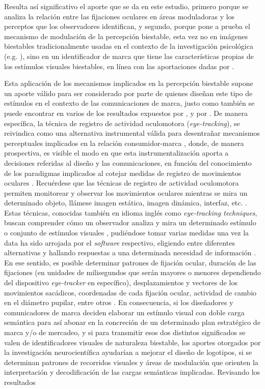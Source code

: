 \documentclass[spanish]{textolivre}
\begin{document}
Resulta así significativo el aporte que se da en este estudio, primero porque se analiza la relación entre las fijaciones oculares en áreas moduladoras y los perceptos que los observadores identifican, y segundo, porque pone a prueba el mecanismo de modulación de la percepción biestable, esta vez no en imágenes biestables tradicionalmente usadas en el contexto de la investigación psicológica (e.g. \textcite{rock_why_1994,kornmeier_ambiguous_2012,hsiao_assessing_2012}), sino en un identificador de marca que tiene las características propias de los estímulos visuales biestables, en línea con las aportaciones dadas por \textcite{rodriguez-martinez_can_2024}. 

Esta aplicación de los mecanismos implicados en la percepción biestable supone un aporte válido para ser considerado por parte de quienes diseñan este tipo de estímulos en el contexto de las comunicaciones de marca, justo como también se puede encontrar en varios de los resultados expuestos por \textcite{azmy_eye_2023}, y por \textcite{rodriguez-martinez_can_2024}. De manera específica, la técnica de registro de actividad oculomotora (\textit{eye-tracking}), se reivindica como una alternativa instrumental válida para desentrañar mecanismos perceptuales implicados en la relación consumidor-marca \cite{santos_eye_2015}, donde, de manera prospectiva, es visible el modo en que esta instrumentalización aporta a decisiones referidas al diseño y las comunicaciones, en función del conocimiento de los paradigmas implicados al cotejar medidas de registro de movimientos oculares \cite{rosa_what_2015}. Recuérdese que las técnicas de registro de actividad oculomotora permiten monitorear y observar los movimientos oculares mientras se mira un determinado objeto, llámese imagen estática, imagen dinámica, interfaz, etc. \cite{rosa_what_2015}. Estas técnicas, conocidas también en idioma inglés como \textit{eye-tracking techniques}, buscan comprender cómo un observador analiza y mira un determinado estímulo o conjunto de estímulos visuales \cite{fu_advances_2016}, pudiéndose tomar varias medidas una vez la data ha sido arrojada por el \textit{software} respectivo, eligiendo entre diferentes alternativas y hallando respuestas a una determinada necesidad de información \cite{carter_best_2020}. En ese sentido, es posible determinar patrones de fijación ocular, duración de las fijaciones (en unidades de milisegundos que serán mayores o menores dependiendo del dispositivo \textit{eye-tracker} en específico), desplazamientos y vectores de los movimientos sacádicos, coordenadas de cada fijación ocular, actividad de cambio en el diámetro pupilar, entre otros \cite{tien_eye_2014}. En consecuencia, si los diseñadores y comunicadores de marca deciden elaborar un estímulo visual con doble carga semántica para así abonar en la concreción de un determinado plan estratégico de marca y/o de mercadeo, y si para transmitir esos dos distintos significados se valen de identificadores visuales de naturaleza biestable, los aportes otorgados por la investigación neurocientífica ayudarían a mejorar el diseño de logotipos, si se determinan patrones de recorridos visuales y áreas de modulación que orienten la interpretación y decodificación de las cargas semánticas implicadas. Revisando los resultados 
\end{document}
